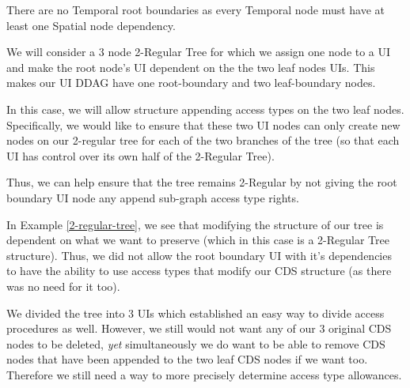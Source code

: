 \begin{con-cor}
	\label{no-temp-root-bounds}
	There are no Temporal root boundaries as every Temporal node must have at least one Spatial node dependency.
\end{con-cor}

\begin{con-ex} 
	\label{2-regular-tree}
	We will consider a 3 node 2-Regular Tree for which we assign one node to a UI and make the root node's UI dependent on the the two leaf nodes UIs. This makes our UI DDAG have one root-boundary and two leaf-boundary nodes.


In this case, we will allow structure appending access types on the two leaf nodes. Specifically, we would like to ensure that these two UI nodes can only create new nodes on our 2-regular tree for each of the two branches of the tree (so that each UI has control over its own half of the 2-Regular Tree).

Thus, we can help ensure that the tree remains 2-Regular by not giving the root boundary UI node any append sub-graph access type rights.
\end{con-ex}

In Example \ref{2-regular-tree}, we see that modifying the structure of our tree is dependent on what we want to preserve (which in this case is a 2-Regular Tree structure). Thus, we did not allow the root boundary UI with it's dependencies to have the ability to use access types that modify our CDS structure (as there was no need for it too).

We divided the tree into 3 UIs which established an easy way to divide access procedures as well. However, we still would not want any of our 3 original CDS nodes to be deleted, \textit{yet} simultaneously we do want to be able to remove CDS nodes that have been appended to the two leaf CDS nodes if we want too. Therefore we still need a way to more precisely determine access type allowances.

